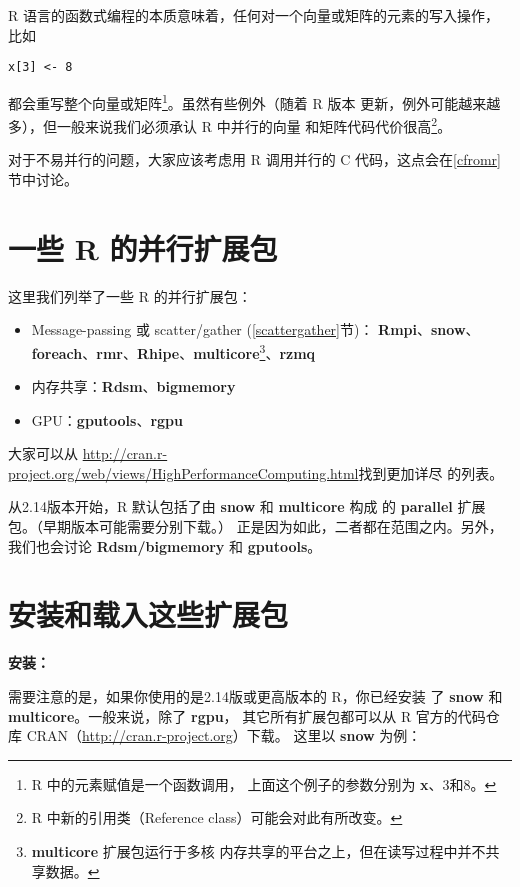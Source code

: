R 语言的函数式编程的本质意味着，任何对一个向量或矩阵的元素的写入操作，
比如
\begin{lstlisting}
x[3] <- 8
\end{lstlisting}
都会重写整个向量或矩阵\footnote{R 中的元素赋值是一个函数调用，
上面这个例子的参数分别为 {\bf x}、3和8。}。虽然有些例外（随着 R 版本
更新，例外可能越来越多），但一般来说我们必须承认 R 中并行的向量
和矩阵代码代价很高\footnote{R 中新的引用类（Reference class）可能会对此有所改变。}。

对于不易并行的问题，大家应该考虑用 R 调用并行的 C 代码，这点会在\ref{cfromr}
节中讨论。

\section{一些 R 的并行扩展包}

这里我们列举了一些 R 的并行扩展包：

\begin{itemize}

\item Message-passing 或 scatter/gather (\ref{scattergather}节)：
{\bf Rmpi}、{\bf snow}、{\bf foreach}、{\bf rmr}、{\bf Rhipe}、{\bf multicore}\footnote{{\bf multicore} 扩展包运行于多核
内存共享的平台之上，但在读写过程中并不共享数据。}、{\bf rzmq}

\item 内存共享：{\bf Rdsm}、{\bf bigmemory}

\item GPU：{\bf gputools}、{\bf rgpu}

\end{itemize}

大家可以从
\url{http://cran.r-project.org/web/views/HighPerformanceComputing.html}找到更加详尽
的列表。

从2.14版本开始，R 默认包括了由 {\bf snow} 和 {\bf multicore} 构成
的 {\bf parallel} 扩展包。（早期版本可能需要分别下载。）
正是因为如此，二者都在范围之内。另外，我们也会讨论
{\bf Rdsm/bigmemory} 和 {\bf gputools}。

\section{安装和载入这些扩展包}

{\bf 安装：}

需要注意的是，如果你使用的是2.14版或更高版本的 R，你已经安装
了 {\bf snow} 和 {\bf multicore}。一般来说，除了 {\bf rgpu}，
其它所有扩展包都可以从 R 官方的代码仓库 CRAN（\url{http://cran.r-project.org}）下载。
这里以 {\bf snow} 为例：

